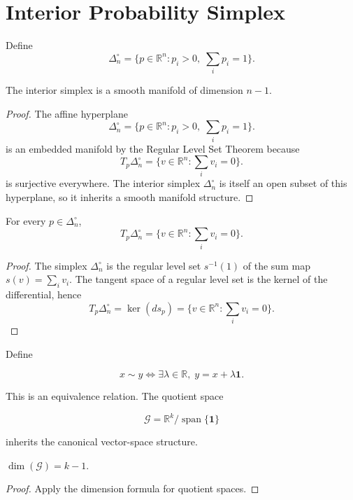 \section{Interior Probability Simplex}\label{ch:sec:interior-probability-simplex}
Define
\[ \Delta_n^\circ=
\{p\in\mathbb R^{n}:p_i>0,\;\sum_i p_i=1\}. \]
\begin{theorem}
\label{ch:thm:1-4}
The interior simplex is a smooth manifold of dimension \(n-1\).
\end{theorem}
\begin{proof} The affine hyperplane \[ \Delta_n^\circ=
\{p\in\mathbb R^{n}:p_i>0,\;\sum_i p_i=1\}. \] is an embedded manifold by
the Regular Level Set Theorem because \[ T_p\Delta_n^\circ=
\{v\in\mathbb R^{n}:\sum_i v_i=0\}. \] is surjective everywhere.
The interior simplex $\Delta_n^\circ$ is itself an open subset of this
hyperplane, so it inherits a smooth manifold structure. 
\end{proof}
\begin{theorem}\label{ch:thm:1-5}

For every \(p\in\Delta_n^\circ\),
\[ T_p\Delta_n^\circ=
\{v\in\mathbb R^{n}:\sum_i v_i=0\}. \]
\end{theorem}
\begin{proof} The simplex $\Delta_n^\circ$ is the regular level set
\(s^{-1}(1)\) of the sum map \(s(v)=\sum_i v_i\).  The tangent space
of a regular level set is the kernel of the differential, hence
\[
T_p\Delta_n^\circ=\ker(ds_p)=\{v\in\mathbb R^n:\textstyle\sum_i v_i=0\}.
\]
\end{proof}

\begin{proposition}\label{ch:prop:2-1}
Define

\[
x\sim y \iff \exists\lambda\in\mathbb R,\; y=x+\lambda\mathbf1.
\]

This is an equivalence relation.  The quotient space

\[
\mathcal G = \mathbb R^{k}/\operatorname{span}\{\mathbf1\}
\]

inherits the canonical vector-space structure.
\end{proposition}

\begin{proposition}\label{ch:prop:2-1-dim}
\(\dim(\mathcal G)=k-1.\)
\end{proposition}
\begin{proof} Apply the dimension formula for quotient spaces.
\end{proof}


